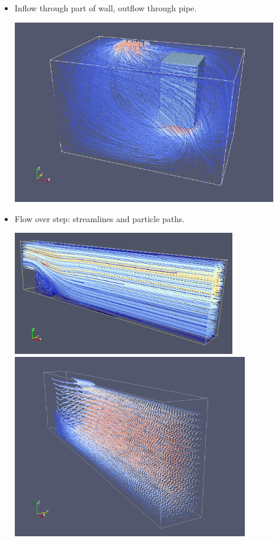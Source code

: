 \documentclass[a4paper, 12pt]{article}
\begin{document}
\begin{itemize}
\item Inflow through part of wall, outflow through pipe. \\
\begin{center}
\includegraphics[height=8cm]{inoutpipe.jpg}
\end{center}
\newpage
\item Flow over step: streamlines and particle paths.\\
\begin{center}
\includegraphics[height=5.4cm]{flowoverstep.png}\\
\includegraphics[height=8cm]{Step-Particles.png}
\end{center}
\end{itemize}
\end{document}
